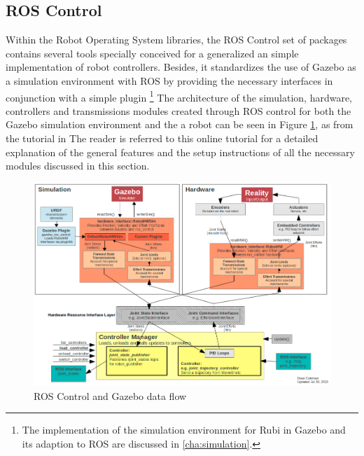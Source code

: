 
\subsection{ROS Control} %
\label{sub:ros_control}
Within the Robot Operating System libraries, the ROS Control set of packages \cite{ros_control} contains several tools specially conceived for a generalized an simple implementation of robot controllers.
Besides, it standardizes the use of Gazebo \cite{gazebo} as a simulation environment with ROS by providing the necessary interfaces in conjunction with a simple plugin \footnote{The implementation of the simulation environment for Rubi in Gazebo and its adaption to ROS are discussed in \ref{cha:simulation}.}
The architecture of the simulation, hardware, controllers and transmissions modules created through ROS control for both the Gazebo simulation environment and the a robot can be seen in Figure \ref{fig:ros_control_gazebo}, as from the tutorial in \cite{ros_control_tutorial} The reader is referred to this online tutorial for a detailed explanation of the general features and the setup instructions of all the necessary modules discussed in this section.

\begin{figure}[ht]
	\centering
	\includegraphics[width=\textwidth]{figures/ros_control_gazebo.png} 
	\caption{ROS Control and Gazebo data flow}
	\label{fig:ros_control_gazebo}
\end{figure}

